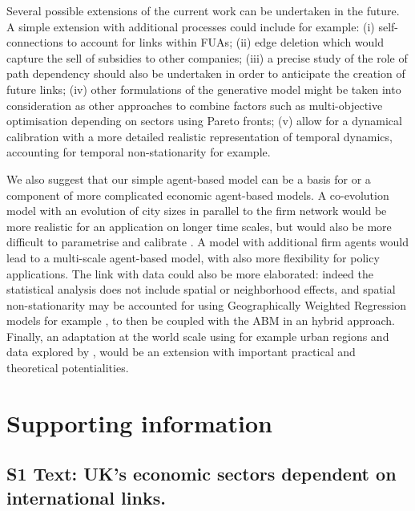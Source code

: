 \documentclass[10pt,letterpaper]{article}
\begin{document}
Several possible extensions of the current work can be undertaken in the future. A simple extension with additional processes could include for example: (i) self-connections to account for links within FUAs; (ii) edge deletion which would capture the sell of subsidies to other companies; (iii) a precise study of the role of path dependency should also be undertaken in order to anticipate the creation of future links; (iv) other formulations of the generative model might be taken into consideration as other approaches to combine factors such as multi-objective optimisation depending on sectors using Pareto fronts; (v) allow for a dynamical calibration with a more detailed realistic representation of temporal dynamics, accounting for temporal non-stationarity for example.

We also suggest that our simple agent-based model can be a basis for or a component of more complicated economic agent-based models. A co-evolution model with an evolution of city sizes in parallel to the firm network would be more realistic for an application on longer time scales, but would also be more difficult to parametrise and calibrate \cite{raimbault2018characterising}. A model with additional firm agents would lead to a multi-scale agent-based model, with also more flexibility for policy applications. The link with data could also be more elaborated: indeed the statistical analysis does not include spatial or neighborhood effects, and spatial non-stationarity may be accounted for using Geographically Weighted Regression models for example \cite{comber2021route}, to then be coupled with the ABM in an hybrid approach. Finally, an adaptation at the world scale using for example urban regions and data explored by \cite{rozenblat2021intra}, would be an extension with important practical and theoretical potentialities. 




\section*{Supporting information}

\subsection*{S1 Text: UK's economic sectors dependent on international links.\label{S1Text}}
\end{document}
